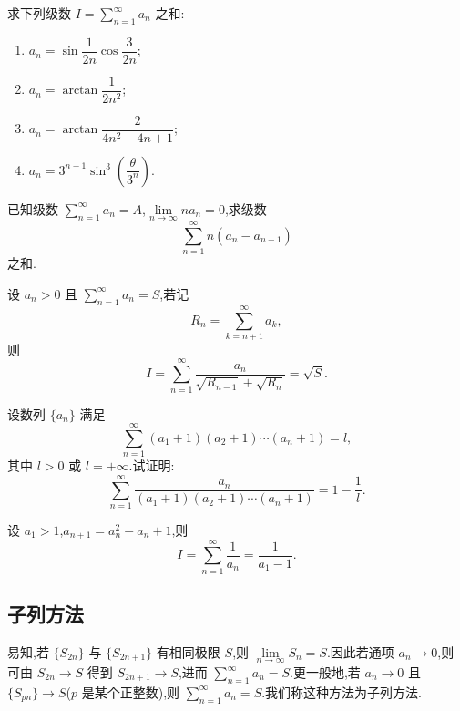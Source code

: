 \documentclass[../../数学分析培优讲义.tex]{subfiles}
\begin{document}
\begin{example}
求下列级数 $\displaystyle I=\sum\limits_{n=1}^{\infty}a_n$ 之和:
\begin{enumerate}[label=(\arabic*)]
    \item $\displaystyle a_n=\sin\dfrac{1}{2n}\cos\dfrac{3}{2n}$;
    \item $\displaystyle a_n=\arctan\dfrac{1}{2n^2}$;
    \item $\displaystyle a_n=\arctan\dfrac{2}{4n^2-4n+1}$;
    \item $\displaystyle a_n=3^{n-1}\sin^3\left(\dfrac{\theta}{3^n}\right)$.
\end{enumerate}
\end{example}
\exampleblank

\begin{example}
已知级数 $\displaystyle\sum\limits_{n=1}^{\infty}a_n=A$,$\displaystyle\lim\limits_{n\to\infty}na_n=0$,求级数
\[
    \sum\limits_{n=1}^{\infty}n(a_n-a_{n+1})
\]
之和.
\end{example}
\exampleblank

\begin{example}
设 $a_n>0$ 且 $\displaystyle\sum\limits_{n=1}^{\infty}a_n=S$,若记
\[
    R_n=\sum\limits_{k=n+1}^{\infty}a_k,
\]
则
\[
    I=\sum\limits_{n=1}^{\infty}\dfrac{a_n}{\sqrt{R_{n-1}}+\sqrt{R_n}}=\sqrt{S}.
\]
\end{example}
\exampleblank

\begin{example}
设数列 $\{a_n\}$ 满足
\[
    \sum\limits_{n=1}^{\infty}(a_1+1)(a_2+1)\cdots(a_n+1)=l,
\]
其中 $l>0$ 或 $l=+\infty$.试证明:
\[
    \sum\limits_{n=1}^{\infty}
    \dfrac{a_n}{(a_1+1)(a_2+1)\cdots(a_n+1)}
    =1-\dfrac{1}{l}.
\]
\end{example}
\exampleblank

\begin{example}
设 $a_1>1$,$a_{n+1}=a_n^2-a_n+1$,则
\[
    I=\sum\limits_{n=1}^{\infty}\dfrac{1}{a_n}=\dfrac{1}{a_1-1}.
\]
\end{example}
\exampleblank



\subsection{子列方法}

易知,若 $\{S_{2n}\}$ 与 $\{S_{2n+1}\}$ 有相同极限 $S$,则 $\displaystyle\lim\limits_{n\to\infty}S_n=S$.因此若通项 $a_n\to0$,则可由 $S_{2n}\to S$ 得到 $S_{2n+1}\to S$,进而 $\displaystyle\sum\limits_{n=1}^{\infty}a_n=S$.更一般地,若 $a_n\to0$ 且 $\{S_{pn}\}\to S$($p$ 是某个正整数),则 $\displaystyle\sum\limits_{n=1}^{\infty}a_n=S$.我们称这种方法为子列方法.
\end{document}
